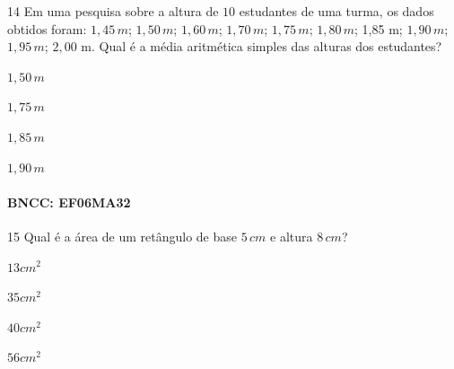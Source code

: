 \num{14} Em uma pesquisa sobre a altura de $10$ estudantes de uma turma, os
dados obtidos foram: $1,45\,m$; $1,50\,m$; $1,60\,m$; $1,70\,m$; $1,75\,m$; $1,80\,m$;
1,85 m; $1,90\,m$; $1,95\,m$; $2,00$ m. Qual é a média aritmética simples das
alturas dos estudantes?

\begin{escolha}
\item $1,50\,m$
\item $1,75\,m$
\item $1,85\,m$
\item $1,90\,m$
\end{escolha}

\paragraph{BNCC: EF06MA32 }


\num{15} Qual é a área de um retângulo de base $5\,cm$ e altura $8\,cm$?

\begin{escolha}
\item
  $13cm^2$
\item
  $35cm^2$
\item
  $40cm^2$
\item
  $56cm^2$
\end{escolha}

